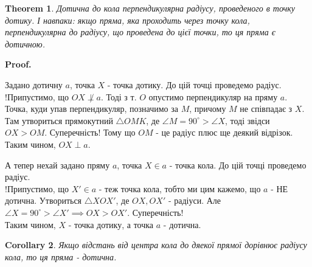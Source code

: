 \documentclass[a4paper, 10pt]{article}
\makeatletter
\def\qed{$\blacksquare$}
\theoremstyle{theoremdd}
\newtheorem{theorem}{Theorem}[subsection]
\theoremstyle{theoremdd}
\theoremstyle{theoremdd}
\theoremstyle{theoremdd}
\theoremstyle{theoremdd}
\theoremstyle{theoremdd}
\theoremstyle{theoremdd}
\theoremstyle{theoremdd}
\theoremstyle{theoremdd}
\newtheorem{corollary}[theorem]{Corollary}
\renewenvironment{proof}[1][Proof.\\]{\par
\pushQED{\hfill \qed}%
\normalfont \topsep6\p@\@plus6\p@\relax
\trivlist
\item\relax
{\bfseries
#1\@addpunct{.}}\hspace\labelsep\ignorespaces
}{%
\popQED\endtrivlist\@endpefalse
}
\makeatother
\begin{document}
\begin{theorem}
Дотична до кола перпендикулярна радіусу, проведеного в точку дотику. І навпаки: якщо пряма, яка проходить через точку кола, перпендикулярна до радіусу, що проведена до цієї точки, то ця пряма є дотичною.
\end{theorem}

\begin{proof}
Задано дотичну $a$, точка $X$ - точка дотику. До цій точці проведемо радіус.\\
!Припустимо, що $OX \not \perp a$. Тоді з т. $O$ опустимо перпендикуляр на пряму $a$. Точка, куди упав перпендикуляр, позначимо за $M$, причому $M$ не співпадає з $X$.\\
Там утвориться прямокутний $\triangle OMK$, де $\angle M = 90^\circ > \angle X$, тоді звідси $OX > OM$. Суперечність! Тому що $OM$ - це радіус плюс ще деякий відрізок.\\
Таким чином, $OX \perp a$.
\begin{figure}[H]
\centering
{}
\end{figure}
А тепер нехай задано пряму $a$, точка $X \in a$ - точка кола. До цій точці проведемо радіус.\\
!Припустимо, що $X' \in a$ - теж точка кола, тобто ми цим кажемо, що $a$ - НЕ дотична. Утвориться $\triangle XOX'$, де $OX,OX'$ - радіуси. Але $\angle X = 90^\circ > \angle X' \implies OX > OX'$. Суперечність!\\
Таким чином, $X$ - точка дотику, а точка $a$ - дотична.
\end{proof}

\begin{corollary}
Якщо відстань від центра кола до дяекої прямої дорівнює радіусу кола, то ця пряма - дотична.
\end{corollary}
\end{document}
